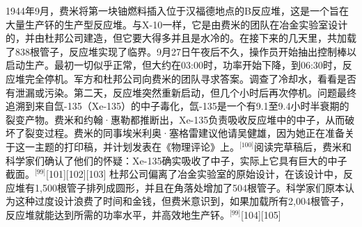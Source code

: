 1944年9月，费米将第一块铀燃料插入位于汉福德地点的B反应堆，这是一个旨在大量生产钚的生产型反应堆。与X-10一样，它是由费米的团队在冶金实验室设计的，并由杜邦公司建造，但它要大得多并且是水冷的。在接下来的几天里，共加载了838根管子，反应堆实现了临界。9月27日午夜后不久，操作员开始抽出控制棒以启动生产。最初一切似乎正常，但大约在03:00时，功率开始下降，到06:30时，反应堆完全停机。军方和杜邦公司向费米的团队寻求答案。调查了冷却水，看看是否有泄漏或污染。第二天，反应堆突然重新启动，但几个小时后再次停机。问题最终追溯到来自氙-135（Xe-135）的中子毒化，氙-135是一个有9.1至9.4小时半衰期的裂变产物。费米和约翰·惠勒都推断出，Xe-135负责吸收反应堆中的中子，从而破坏了裂变过程。费米的同事埃米利奥·塞格雷建议他请吴健雄，因为她正在准备关于这一主题的打印稿，并计划发表在《物理评论》上。\(^\text{[100]}\)阅读完草稿后，费米和科学家们确认了他们的怀疑：Xe-135确实吸收了中子，实际上它具有巨大的中子截面。\(^\text{[99]}\)[101][102][103] 杜邦公司偏离了冶金实验室的原始设计，在该设计中，反应堆有1,500根管子排列成圆形，并且在角落处增加了504根管子。科学家们原本认为这种过度设计浪费了时间和金钱，但费米意识到，如果加载所有2,004根管子，反应堆就能达到所需的功率水平，并高效地生产钚。\(^\text{[99]}\)[104][105]
